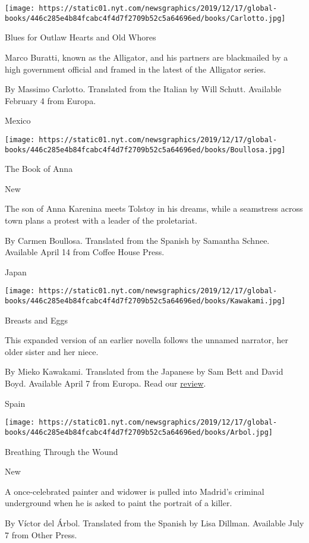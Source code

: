 \texttt{[image: https://static01.nyt.com/newsgraphics/2019/12/17/global-books/446c285e4b84fcabc4f4d7f2709b52c5a64696ed/books/Carlotto.jpg]}

Blues for Outlaw Hearts and Old Whores

Marco Buratti, known as the Alligator, and his partners are blackmailed
by a high government official and framed in the latest of the Alligator
series.

 By Massimo Carlotto. Translated from the Italian by Will Schutt.
Available February 4 from Europa.

Mexico

\texttt{[image: https://static01.nyt.com/newsgraphics/2019/12/17/global-books/446c285e4b84fcabc4f4d7f2709b52c5a64696ed/books/Boullosa.jpg]}

The Book of Anna

New

The son of Anna Karenina meets Tolstoy in his dreams, while a seamstress
across town plans a protest with a leader of the proletariat.

 By Carmen Boullosa. Translated from the Spanish by Samantha Schnee.
Available April 14 from Coffee House Press.

Japan

\texttt{[image: https://static01.nyt.com/newsgraphics/2019/12/17/global-books/446c285e4b84fcabc4f4d7f2709b52c5a64696ed/books/Kawakami.jpg]}

Breasts and Eggs

This expanded version of an earlier novella follows the unnamed
narrator, her older sister and her niece.

 By Mieko Kawakami. Translated from the Japanese by Sam Bett and David
Boyd. Available April 7 from Europa. Read our
\href{https://www.nytimes.com/2020/04/07/books/review/breasts-and-eggs-mieko-kawakami.html}{review}.

Spain

\texttt{[image: https://static01.nyt.com/newsgraphics/2019/12/17/global-books/446c285e4b84fcabc4f4d7f2709b52c5a64696ed/books/Arbol.jpg]}

Breathing Through the Wound

New

A once-celebrated painter and widower is pulled into Madrid's criminal
underground when he is asked to paint the portrait of a killer.

 By Víctor del Árbol. Translated from the Spanish by Lisa Dillman.
Available July 7 from Other Press.

